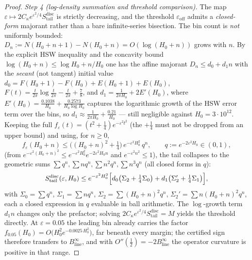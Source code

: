 \documentclass[11pt]{article}
\newcommand{\Binfline}{B_{\mathrm{line}}^{\infty}} %
\begin{document}
\begin{proof}
\emph{Step 4 (log-density summation and threshold comparison).}
The map $\varepsilon\mapsto 2C_\kappa e^{\varepsilon^2/4}
S_{\mathrm{tail}}^{\mathrm{disc}}$ is strictly decreasing, and the threshold
$\varepsilon_{\mathrm{off}}$ admits a \emph{closed-form} majorant rather than
a bare infinite-series bisection. The bin count is \emph{not} uniformly
bounded: $D_n:=N(H_0+n+1)-N(H_0+n)=O(\log(H_0+n))$ grows with $n$. By the
explicit HSW inequality and the concavity bound
$\log(H_0+n)\le\log H_0+n/H_0$ one has the affine majorant
$D_n\le d_0+d_1 n$ with the \emph{secant} (not tangent) initial value
$d_0=F(H_0+1)-F(H_0)+E(H_0+1)+E(H_0)$,
$F(t)=\tfrac{t}{2\pi}\log\tfrac{t}{2\pi}-\tfrac{t}{2\pi}+\tfrac78$, and
$d_1=\tfrac1{2\pi H_0}+2E'(H_0)$, where
$E'(H_0)=\tfrac{0.1038}{H_0}+\tfrac{0.2573}{H_0\log H_0}$ captures the
logarithmic growth of the HSW error term over the bins, so
$d_1\approx\tfrac1{2\pi H_0}+\tfrac{0.21}{H_0}$ --- still negligible against
$H_0=3\cdot10^{12}$.
Keeping the full $f_\varepsilon(t)=(t^2+\tfrac14)e^{-\varepsilon^2t^2}$
(the $+\tfrac14$ must not be dropped from an upper bound) and using, for $n\ge0$,
\[
f_\varepsilon(H_0+n)\le \bigl((H_0+n)^2+\tfrac14\bigr)\, e^{-\varepsilon^2 H_0^2}\,q^{n},
\qquad q:=e^{-2\varepsilon^2 H_0}\in(0,1),
\]
(from $e^{-\varepsilon^2(H_0+n)^2}\le e^{-\varepsilon^2H_0^2}e^{-2\varepsilon^2H_0 n}$
and $e^{-\varepsilon^2 n^2}\le1$), the tail collapses to the geometric sums
$\sum q^n,\sum n q^n,\sum n^2 q^n,\sum n^3 q^n$ (all closed forms in $q$):
\[
S_{\mathrm{tail}}^{\mathrm{disc}}(\varepsilon,H_0)
 \le e^{-\varepsilon^2 H_0^2}
 \Bigl[d_0\bigl(\Sigma_2+\tfrac14\Sigma_0\bigr)
      +d_1\bigl(\Sigma_2'+\tfrac14\Sigma_1\bigr)\Bigr],
\]
with $\Sigma_0=\sum q^n$, $\Sigma_1=\sum nq^n$, $\Sigma_2=\sum(H_0+n)^2q^n$,
$\Sigma_2'=\sum n(H_0+n)^2q^n$, each a closed expression in $q$ evaluable in
ball arithmetic. The $\log$-growth term $d_1 n$ changes only the prefactor;
solving $2C_\kappa e^{\varepsilon^2/4}S_{\mathrm{tail}}^{\mathrm{disc}}=M$
yields the threshold directly.
At $\varepsilon=0.05$ the leading bin already carries the factor
$f_{0.05}(H_0)=O\bigl(H_0^2 e^{-0.0025\,H_0^2}\bigr)$, far beneath every
margin; the certified sign therefore transfers to $\Binfline$, and with
$O''(\tfrac12)=-2\Binfline$ the operator curvature is positive in that range.
\end{proof}
\end{document}
